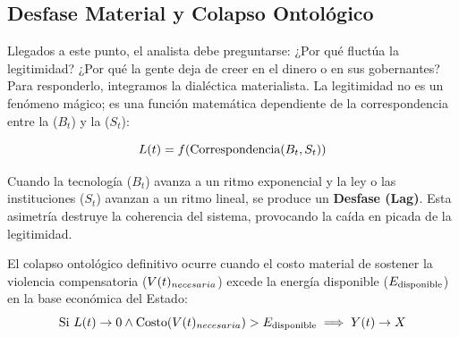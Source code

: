 \subsection{Desfase Material y Colapso Ontológico}

Llegados a este punto, el analista debe preguntarse: ¿Por qué fluctúa la legitimidad? ¿Por qué la gente deja de creer en el dinero o en sus gobernantes? Para responderlo, integramos la dialéctica materialista. La legitimidad no es un fenómeno mágico; es una función matemática dependiente de la correspondencia entre la \BaseMaterial{} ($B_t$) y la \Superestructura{} ($S_t$):

\begin{equation}
    L(t) = f(\text{Correspondencia}(B_t, S_t))
\end{equation}

Cuando la tecnología ($B_t$) avanza a un ritmo exponencial y la ley o las instituciones ($S_t$) avanzan a un ritmo lineal, se produce un \textbf{Desfase (Lag)}. Esta asimetría destruye la coherencia del sistema, provocando la caída en picada de la legitimidad.

El colapso ontológico definitivo ocurre cuando el costo material de sostener la violencia compensatoria ($V(t)_{necesaria}$) excede la energía disponible ($E_{\text{disponible}}$) en la base económica del Estado:
\begin{equation}
    \text{Si } L(t) \to 0 \land \text{Costo}(V(t)_{necesaria}) > E_{\text{disponible}} \implies Y(t) \to X
\end{equation}

